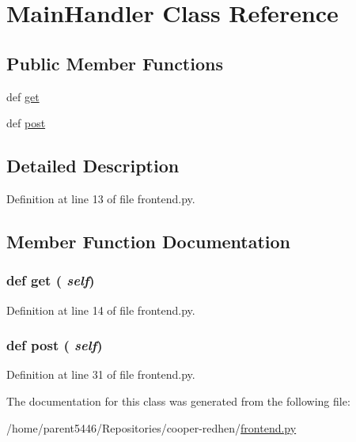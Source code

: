 \hypertarget{classfrontend_1_1_main_handler}{
\section{MainHandler Class Reference}
\label{classfrontend_1_1_main_handler}
}
\subsection*{Public Member Functions}
\begin{DoxyCompactItemize}
\item 
def \hyperlink{classfrontend_1_1_main_handler_a444a1328efb32d5d9d2dcb2efe855d3b}{get}
\item 
def \hyperlink{classfrontend_1_1_main_handler_a49eef07c2e643292b02accabc4f0c182}{post}
\end{DoxyCompactItemize}


\subsection{Detailed Description}


Definition at line 13 of file frontend.py.



\subsection{Member Function Documentation}
\hypertarget{classfrontend_1_1_main_handler_a444a1328efb32d5d9d2dcb2efe855d3b}{
\subsubsection[{get}]{\setlength{\rightskip}{0pt plus 5cm}def get ( {\em self})}}
\label{classfrontend_1_1_main_handler_a444a1328efb32d5d9d2dcb2efe855d3b}


Definition at line 14 of file frontend.py.

\hypertarget{classfrontend_1_1_main_handler_a49eef07c2e643292b02accabc4f0c182}{
\subsubsection[{post}]{\setlength{\rightskip}{0pt plus 5cm}def post ( {\em self})}}
\label{classfrontend_1_1_main_handler_a49eef07c2e643292b02accabc4f0c182}


Definition at line 31 of file frontend.py.



The documentation for this class was generated from the following file:\begin{DoxyCompactItemize}
\item 
/home/parent5446/Repositories/cooper-\/redhen/\hyperlink{frontend_8py}{frontend.py}\end{DoxyCompactItemize}
